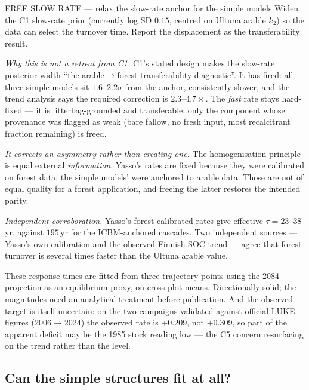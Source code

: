 \documentclass[11pt]{article}
\begin{document}
\begin{proposal}{FREE SLOW RATE --- relax the slow-rate anchor for the simple models}
Widen the C1 slow-rate prior (currently log SD $0.15$, centred on Ultuna arable $k_2$) so the
data can select the turnover time. Report the displacement as the transferability result.

\smallskip
\emph{Why this is not a retreat from C1.} C1's stated design makes the slow-rate posterior width
``the arable$\rightarrow$forest transferability diagnostic''. It has fired: all three simple
models sit $1.6$--$2.2\sigma$ from the anchor, consistently slower, and the trend analysis says
the required correction is $2.3$--$4.7\times$. The \emph{fast} rate stays hard-fixed --- it is
litterbag-grounded and transferable; only the component whose provenance was flagged as weak
(bare fallow, no fresh input, most recalcitrant fraction remaining) is freed.

\smallskip
\emph{It corrects an asymmetry rather than creating one.} The homogenisation principle is equal
external \emph{information}. Yasso's rates are fixed because they were calibrated on forest data;
the simple models' were anchored to arable data. Those are not of equal quality for a forest
application, and freeing the latter restores the intended parity.

\smallskip
\emph{Independent corroboration.} Yasso's forest-calibrated rates give effective
$\tau = 23$--$38$\,yr, against $195$\,yr for the ICBM-anchored cascades. Two independent
sources --- Yasso's own calibration and the observed Finnish SOC trend --- agree that forest
turnover is several times faster than the Ultuna arable value.
\end{proposal}

\begin{caveat}
These response times are fitted from three trajectory points using the 2084 projection as an
equilibrium proxy, on cross-plot means. Directionally solid; the magnitudes need an analytical
treatment before publication. And the observed target is itself uncertain: on the two campaigns
validated against official LUKE figures (2006$\rightarrow$2024) the observed rate is $+0.209$,
not $+0.309$, so part of the apparent deficit may be the 1985 stock reading low --- the C5
concern resurfacing on the trend rather than the level.
\end{caveat}

\subsection{Can the simple structures fit at all?}\label{sec:cansimplefit}
\end{document}
